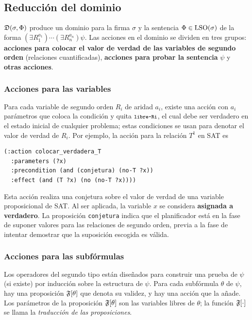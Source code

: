 
\subsection{Reducción del dominio}

$\mathfrak{D}(\sigma,\Phi)$ produce un dominio para la firma
$\sigma$ y la sentencia $\Phi\in\text{LSO}(\sigma)$ de la forma
$(\exists R_1^{a_1})\cdots(\exists R_n^{a_n})\psi$.
Las acciones en el dominio se dividen en tres grupos: \textbf{acciones para 
colocar el valor de verdad de las variables de segundo orden} (relaciones
cuantificadas), \textbf{acciones para probar la sentencia} $\psi$ y \textbf{otras
acciones}.

\subsubsection{Acciones para las variables}
Para cada variable de segundo orden $R_i$ de aridad $a_i$,
existe una acción  con $a_i$ parámetros que
coloca la condición  y quita ${\texttt{\footnotesize libre-Ri}}$, el cual debe ser
verdadero en el estado inicial de cualquier problema;
estas condiciones se usan para denotar el valor de
verdad de $R_i$. Por ejemplo, la acción para la relación $T^1$ en SAT es

{\footnotesize
\begin{Verbatim}
(:action colocar_verdadera_T
  :parameters (?x)
  :precondition (and (conjetura) (no-T ?x))
  :effect (and (T ?x) (no (no-T ?x))))
\end{Verbatim}
}

Esta acción realiza una conjetura sobre el valor de verdad de una variable
proposicional de SAT. Al ser aplicada, la variable $x$ se considera
\textbf{asignada a verdadero}. La proposición \texttt{conjetura} indica que el
planificador está en la fase de suponer valores para las relaciones de segundo
orden, previa a la fase de intentar demostrar que la suposición escogida es
válida.

\subsubsection{Acciones para las subfórmulas}
Los operadores del segundo tipo están diseñados para construir una prueba de
$\psi$ (si existe) por inducción sobre la estructura de $\psi$.
Para cada subfórmula $\theta$ de $\psi$, hay una proposición
$\mathfrak{F}[\theta]$ que denota su validez, y hay una acción que la añade.
Los parámetros de la proposición $\mathfrak{F}[\theta]$ son las variables libres de
$\theta$; la función $\mathfrak{F}[\cdot]$ se llama la \textit{traducción de las
proposiciones}.

